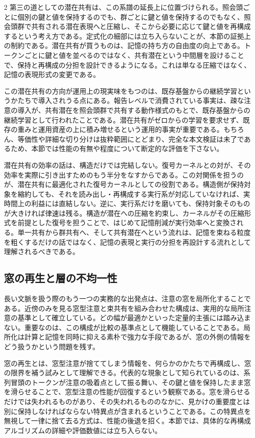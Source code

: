 \documentclass[lualatex,a4paper,10pt]{jlreq}
\begin{document}
\begin{multicols}{2}
第三の道としての潜在共有は、この系譜の延長上に位置づけられる。照会頭ごとに個別の鍵と値を保持するのでも、群ごとに鍵と値を保持するのでもなく、照会頭群で共有される潜在表現へと圧縮し、そこから必要に応じて鍵と値を再構成するという考え方である。定式化の細部には立ち入らないことが、本節の証拠上の制約である。潜在共有が買うものは、記憶の持ち方の自由度の向上である。トークンごとに鍵と値を並べるのではなく、共有潜在という中間層を設けることで、保持と再構成の分担を設計できるようになる。これは単なる圧縮ではなく、記憶の表現形式の変更である。

この潜在共有の方向が運用上の現実味をもつのは、既存基盤からの継続学習というかたちで導入されうる点にある。報告レベルで消費されている事実は、疎な注意の導入が、共有潜在を照会頭群で共有する動作様式のもとで、既存基盤からの継続学習として行われたことである\autocite{v32report}。潜在共有がゼロからの学習を要求せず、既存の重みと運用資産の上に積み増せるという運用的事実が重要である。もちろん、等価性や詳細な切り分けは抜粋範囲にとどまり、完全な本文検証は未了であるため、本節では性能の有無や程度について断定的な評価を下さない。

潜在共有の効率の話は、構造だけでは完結しない。復号カーネルとの対が、その効率を実際に引き出すためのもう半分をなすからである。この対関係を担うのが、潜在共有に最適化された復号カーネルとしての役割である\autocite{flashmla}。構造側が保持対象を縮約しても、それを読み出し・再構成する実行系が対応していなければ、実時間上の利益には直結しない。逆に、実行系だけを磨いても、保持対象そのものが大きければ律速は残る。構造が潜在への圧縮を約束し、カーネルがその圧縮形式を前提とした復号を担うことで、はじめて記憶削減が実行効率へと変換される。単一共有から群共有へ、そして共有潜在へという流れは、記憶を束ねる粒度を粗くするだけの話ではなく、記憶の表現と実行の分担を再設計する流れとして理解されるべきである。

\subsection{窓の再生と層の不均一性}
長い文脈を扱う際のもう一つの実務的な出発点は、注意の窓を局所化することである。近傍のみを見る窓型注意と束共有を組み合わせた構成は、実用的な局所注意の基準として確立している\autocite{mistral7b}。どの幅が最適かといった定量的主張には踏み込まない。重要なのは、この構成が比較の基準点として機能していることである。局所化は計算と記憶を同時に抑える素朴で強力な手段であるが、窓の外側の情報をどう扱うかという問題を残す。

窓の再生とは、窓型注意が捨ててしまう情報を、何らかのかたちで再構成し、窓の限界を補う試みとして理解できる。代表的な現象として知られているのは、系列冒頭のトークンが注意の吸着点として振る舞い、その鍵と値を保持したまま窓を滑らせることで、窓型注意の性能が回復するという観察である\autocite{sinks}。窓を滑らせるだけでは失われるものがあり、その失われるもののなかに、見かけの重要度とは別に保持しなければならない特異点が含まれるということである。この特異点を無視して一律に捨て去る方式は、性能の後退を招く。本節では、具体的な再構成アルゴリズムの詳細や評価数値には立ち入らない。


\end{multicols}
\end{document}
